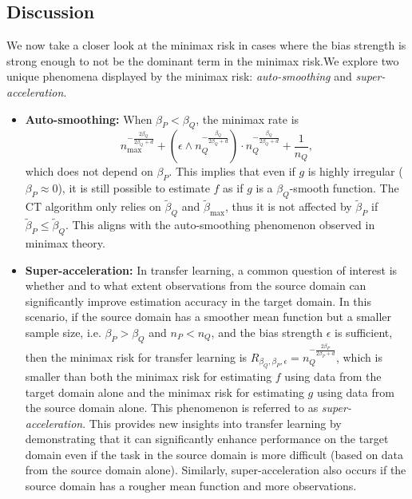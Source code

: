 \documentclass{article}
\begin{document}
\subsection{Discussion}
\label{section: discussion of minimax}

We now take a closer look at the minimax risk in cases where the bias strength is strong enough to not be the dominant term in the minimax risk.We explore two unique phenomena displayed by the minimax risk: {\it auto-smoothing} and {\it super-acceleration}. 


\begin{itemize} 

 \item \textbf{Auto-smoothing:}  When $\beta_P<\beta_Q$, the minimax rate  is
  $$ n_{\max}^{-\frac{2\beta_Q}{2\beta_Q+d}}+ (\epsilon \wedge n_Q^{-\frac{\beta_Q}{2\beta_Q+d}})\cdot n_Q^{-\frac{\beta_Q}{2\beta_Q+d}}+\frac{1}{n_Q},$$ which does not depend on $\beta_P$. This implies that even if $g$ is highly irregular ($\beta_P\approx 0$), it is still possible to estimate $f$ as if $g$ is a $\beta_Q$-smooth function. The CT algorithm only relies on $\tilde \beta_Q$ and $\tilde \beta_{\max}$, thus it is not affected by $\tilde \beta_P$ if $\tilde \beta_P \leq \tilde \beta_Q$. This aligns with the auto-smoothing phenomenon observed in minimax theory.
 
\item \textbf{Super-acceleration:} In transfer learning, a common question of interest is whether and to what extent observations from the source domain can significantly improve estimation accuracy in the target domain. In this scenario, if the source domain has a smoother mean function but a smaller sample size, i.e. $\beta_P > \beta_Q$ and $n_P < n_Q$, and the bias strength $\epsilon$ is sufficient, then the minimax risk for transfer learning is $R_{\beta_Q,\beta_P,\epsilon}= n_Q^{-\frac{2\beta_P}{2\beta_P+d}}$, which is smaller than both the minimax risk for estimating $f$ using data from the target domain alone and the minimax risk for estimating $g$ using data from the source domain alone. This phenomenon is referred to as  {\it super-acceleration}.
This provides new insights into transfer learning by demonstrating that it can significantly enhance performance on the target domain even if the task in the source domain is more difficult (based on data from the source domain alone). Similarly, super-acceleration also occurs if the source domain has a rougher mean function and more observations.


\end{itemize}
\end{document}
